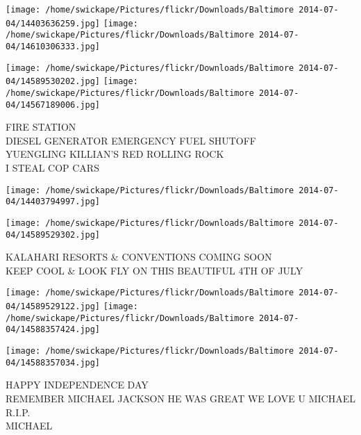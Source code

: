 \documentclass[10pt,letterpaper]{article}
\begin{document}
\texttt{[image: /home/swickape/Pictures/flickr/Downloads/Baltimore 2014-07-04/14403636259.jpg]}
\texttt{[image: /home/swickape/Pictures/flickr/Downloads/Baltimore 2014-07-04/14610306333.jpg]}

\texttt{[image: /home/swickape/Pictures/flickr/Downloads/Baltimore 2014-07-04/14589530202.jpg]}
\texttt{[image: /home/swickape/Pictures/flickr/Downloads/Baltimore 2014-07-04/14567189006.jpg]}

FIRE STATION\\
DIESEL GENERATOR EMERGENCY FUEL SHUTOFF\\
YUENGLING KILLIAN'S RED ROLLING ROCK\\
I STEAL COP CARS\\
\pagebreak

\texttt{[image: /home/swickape/Pictures/flickr/Downloads/Baltimore 2014-07-04/14403794997.jpg]}

\vspace{0.25in}
\texttt{[image: /home/swickape/Pictures/flickr/Downloads/Baltimore 2014-07-04/14589529302.jpg]}

KALAHARI RESORTS \& CONVENTIONS COMING SOON\\
KEEP COOL \& LOOK FLY ON THIS BEAUTIFUL 4TH OF JULY\\
\pagebreak

\texttt{[image: /home/swickape/Pictures/flickr/Downloads/Baltimore 2014-07-04/14589529122.jpg]}
\texttt{[image: /home/swickape/Pictures/flickr/Downloads/Baltimore 2014-07-04/14588357424.jpg]}

\texttt{[image: /home/swickape/Pictures/flickr/Downloads/Baltimore 2014-07-04/14588357034.jpg]}

HAPPY INDEPENDENCE DAY\\
REMEMBER MICHAEL JACKSON HE WAS GREAT WE LOVE U MICHAEL R.I.P.\\
MICHAEL\\
\pagebreak
\end{document}
